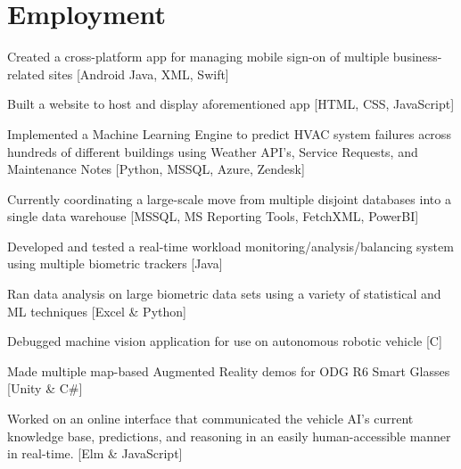 \documentclass[letterpaper]{headers} %
\begin{document}
\begin{minipage}[t]{0.66\textwidth}

\section{Employment}

	\vspace{\topsep}
	\begin{tightitemize}
		\item Created a cross-platform app for managing mobile sign-on of multiple business-related sites [Android Java, XML, Swift]
		\item Built a website to host and display aforementioned app [HTML, CSS, JavaScript]
		\item Implemented a Machine Learning Engine to predict HVAC system failures across hundreds of different buildings using Weather API's, Service Requests, and Maintenance Notes [Python, MSSQL, Azure, Zendesk]
		\item Currently coordinating a large-scale move from multiple disjoint databases into a single data warehouse [MSSQL, MS Reporting Tools, FetchXML, PowerBI]
	\end{tightitemize}
	
	\sectionspace

	\begin{tightitemize}
		\item Developed and tested a real-time workload monitoring/analysis/balancing system using multiple biometric trackers [Java]
		\item Ran data analysis on large biometric data sets using a variety of statistical and ML techniques [Excel \& Python]
		\item Debugged machine vision application for use on autonomous robotic vehicle [C]
		\item Made multiple map-based Augmented Reality demos for ODG R6 Smart Glasses [Unity \& C\#]
		\item Worked on an online interface that communicated the vehicle AI's current knowledge base, predictions, and reasoning in an easily human-accessible manner in real-time. [Elm \& JavaScript]
	\end{tightitemize}
	

\end{minipage}
\end{document}
